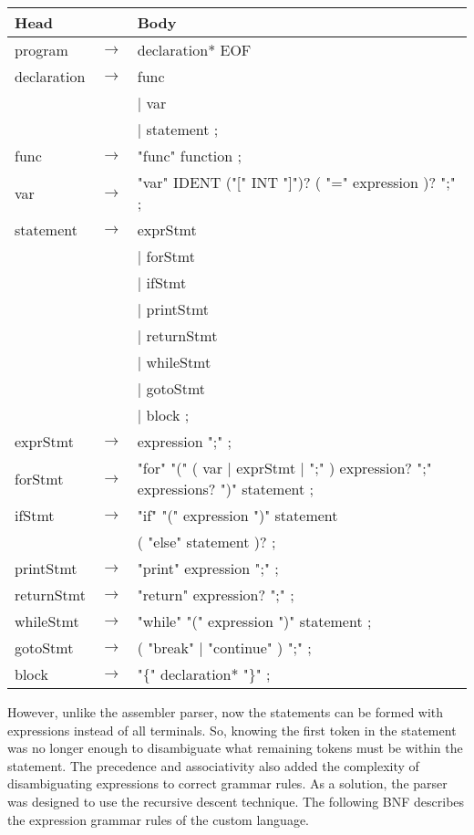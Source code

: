 \documentclass[manuscript,screen,nonacm]{acmart}
\begin{document}
\begin{center}
\begin{tabular}{l l l}
    \hline
    Head & & Body \\
    \hline
    program & $\rightarrow$ & declaration* EOF \\
    declaration & $\rightarrow$ & func \\
    ~ & ~ & | var \\
    ~ & ~ & | statement ; \\
    func & $\rightarrow$ & "func" function ; \\
    var & $\rightarrow$ & "var" IDENT ("[" INT "]")? ( "=" expression )? ";" ; \\
    statement & $\rightarrow$ & exprStmt \\
    ~ & ~ & | forStmt \\
    ~ & ~ & | ifStmt \\
    ~ & ~ & | printStmt \\
    ~ & ~ & | returnStmt \\
    ~ & ~ & | whileStmt \\
    ~ & ~ & | gotoStmt \\
    ~ & ~ & | block ; \\
    exprStmt & $\rightarrow$ & expression ";" ; \\
    forStmt & $\rightarrow$ & "for" "(" ( var | exprStmt | ";" ) expression? ";" expressions? ")" statement ; \\
    ifStmt & $\rightarrow$ & "if" "(" expression ")" statement \\
    ~ & ~ & ( "else" statement )? ; \\
    printStmt & $\rightarrow$ & "print" expression ";" ; \\
    returnStmt & $\rightarrow$ & "return" expression? ";" ; \\
    whileStmt & $\rightarrow$ & "while" "(" expression ")" statement ; \\
    gotoStmt & $\rightarrow$ & ( "break" | "continue" ) ";" ; \\
    block & $\rightarrow$ & "$\{$" declaration* "$\}$" ; \\
    \hline
\end{tabular}
\end{center}

However, unlike the assembler parser, now the statements can be formed with expressions instead of all terminals. So, knowing the first token in the statement was no longer enough to disambiguate what remaining tokens must be within the statement. The precedence and associativity also added the complexity of disambiguating expressions to correct grammar rules. 
As a solution, the parser was designed to use the recursive descent technique. The following BNF describes the expression grammar rules of the custom language. 
\end{document}
